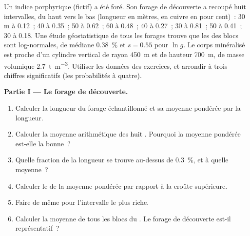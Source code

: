 \begin{problem}\label{pb:b2:ore-deposits:1}
Un indice porphyrique (fictif) a été foré. Son forage de découverte a recoupé huit intervalles, du
haut vers le bas (longueur en mètres,  en cuivre en pour cent)~: 30 m à 0.12~; 40 à 0.35~;
50 à 0.62~; 60 à 0.48~; 40 à 0.27~; 30 à 0.81~; 50 à 0.41~; 30 à 0.18. Une étude géostatistique
de tous les forages trouve que les  des blocs sont log-normales, de médiane \qty{0.38}{\percent}
et $s = 0.55$ pour $\ln g$. Le corps minéralisé est proche d'un cylindre vertical de rayon
\qty{450}{m} et de hauteur \qty{700}{m}, de masse volumique \qty{2.7}{t.m^{-3}}. Utiliser les
données des exercices, et arrondir à trois chiffres significatifs (les probabilités à quatre).

\noindent\textbf{Partie I --- Le forage de découverte.}
\begin{enumerate}
  \item Calculer la longueur du forage échantillonné et sa  moyenne pondérée par la longueur.
  \item Calculer la moyenne arithmétique des huit . Pourquoi la moyenne pondérée est-elle la bonne~?
  \item Quelle fraction de la longueur se trouve au-dessus de \qty{0.3}{\percent}, et à quelle  moyenne~?
  \item Calculer le  de la  moyenne pondérée par rapport à la croûte supérieure.
  \item Faire de même pour l'intervalle le plus riche.
  \item Calculer la  moyenne de tous les blocs du . Le forage de découverte est-il représentatif~?
\end{enumerate}


\end{problem}
